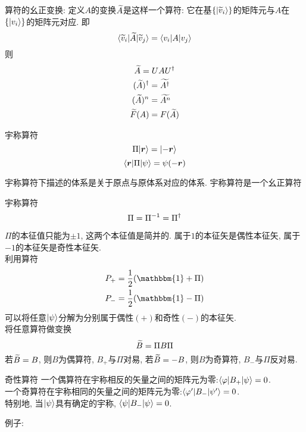 \documentclass[UTF8]{ctexart}
\numberwithin{equation}{subsection}
\begin{document}
算符的幺正变换:
定义$A$的变换$\widetilde{A}$是这样一个算符: 它在基$\{| {\widetilde{v}_i} \rangle\}$的矩阵元与$A$在$\{| {v_i} \rangle\}$的矩阵元对应. 即
$$\langle {\widetilde{v}_i|\widetilde{A}|\widetilde{v}_j} \rangle = \langle {v_i|A|v_j} \rangle$$
则
$$\widetilde{A}=UAU^{\dagger}$$
$$\begin{aligned} 
    (\widetilde{A})^{\dagger} &= \widetilde{A^{\dagger}}\\
    (\widetilde{A})^n &= \widetilde{A^n}\\
    \widetilde{F}(A) &= F(\widetilde{A})
 \end{aligned}$$
\begin{defi}{宇称算符}{}
$$\Pi| {\bm{r}} \rangle=| {-\bm{r}} \rangle$$
$$\langle {\bm{r}|\Pi|\psi} \rangle=\psi(-\bm{r})$$
\end{defi}
宇称算符下描述的体系是关于原点与原体系对应的体系. 宇称算符是一个幺正算符\\
\begin{xz}{宇称算符}{}
$$\Pi=\Pi^{-1}=\Pi^{\dagger}$$
\end{xz}
$\Pi$的本征值只能为$\pm1$, 这两个本征值是简并的. 属于$1$的本征矢是偶性本征矢, 属于$-1$的本征矢是奇性本征矢.\\
利用算符
$$\ar{
    P_+=\ff{2}(\mathbbm{1}+\Pi)\\
    P_-=\ff{2}(\mathbbm{1}-\Pi)
}$$
可以将任意$| {\psi} \rangle$分解为分别属于偶性$(+)$和奇性$(-)$的本征矢. \\
将任意算符做变换
$$\widetilde{B}=\Pi B \Pi$$
若$\widetilde{B}=B$, 则$B$为偶算符, $B_+$与$\Pi$对易, 若$\widetilde{B}=-B$, 则$B$为奇算符, $B_-$与$\Pi$反对易.\\
\begin{xz}{奇性算符}{}
一个偶算符在宇称相反的矢量之间的矩阵元为零:$\langle {\varphi|B_+|\psi} \rangle=0$. \\
一个奇算符在宇称相同的矢量之间的矩阵元为零:$\langle {\varphi'|B_-|\psi'} \rangle=0$. \\
特别地, 当$| {\psi} \rangle$具有确定的宇称, $\langle {\psi|B_-|\psi} \rangle=0$.
\end{xz}
例子:
\end{document}
